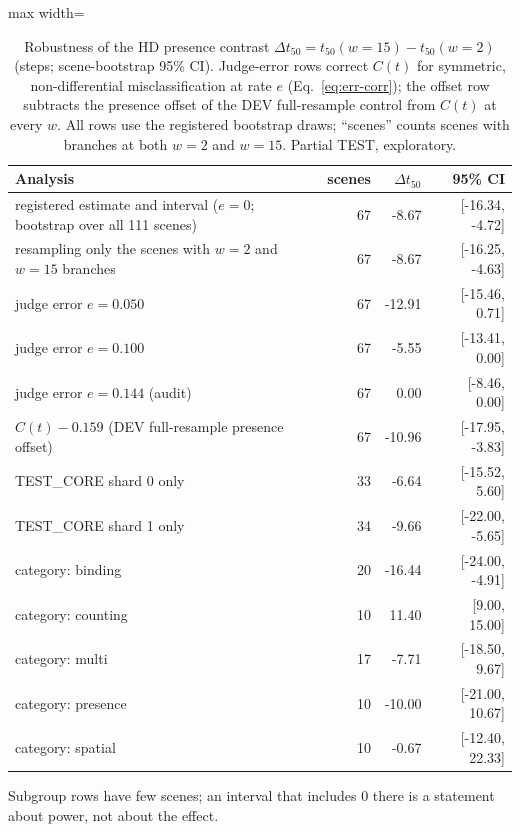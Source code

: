 \begin{table}[t]\centering\small
\caption{Robustness of the HD presence contrast $\Delta t_{50} = t_{50}(w{=}15) - t_{50}(w{=}2)$ (steps; scene-bootstrap 95\% CI). Judge-error rows correct $C(t)$ for symmetric, non-differential misclassification at rate $e$ (Eq.~\ref{eq:err-corr}); the offset row subtracts the presence offset of the DEV full-resample control from $C(t)$ at every $w$. All rows use the registered bootstrap draws; ``scenes'' counts scenes with branches at both $w = 2$ and $w = 15$. Partial TEST, exploratory.}\label{tab:partial-robust-hd}
\begin{adjustbox}{max width=\linewidth}\begin{tabular}{lrrr}
\toprule
Analysis & scenes & $\Delta t_{50}$ & 95\% CI \\
\midrule
registered estimate and interval ($e = 0$; bootstrap over all 111 scenes) & 67 & -8.67 & [-16.34, -4.72] \\
resampling only the scenes with $w = 2$ and $w = 15$ branches & 67 & -8.67 & [-16.25, -4.63] \\
judge error $e = 0.050$ & 67 & -12.91 & [-15.46, 0.71] \\
judge error $e = 0.100$ & 67 & -5.55 & [-13.41, 0.00] \\
judge error $e = 0.144$ (audit) & 67 & 0.00 & [-8.46, 0.00] \\
$C(t) - 0.159$ (DEV full-resample presence offset) & 67 & -10.96 & [-17.95, -3.83] \\
TEST\_CORE shard 0 only & 33 & -6.64 & [-15.52, 5.60] \\
TEST\_CORE shard 1 only & 34 & -9.66 & [-22.00, -5.65] \\
category: binding & 20 & -16.44 & [-24.00, -4.91] \\
category: counting & 10 & 11.40 & [9.00, 15.00] \\
category: multi & 17 & -7.71 & [-18.50, 9.67] \\
category: presence & 10 & -10.00 & [-21.00, 10.67] \\
category: spatial & 10 & -0.67 & [-12.40, 22.33] \\
\bottomrule
\end{tabular}\end{adjustbox}
\par\smallskip\footnotesize Subgroup rows have few scenes; an interval that includes 0 there is a statement about power, not about the effect.
\end{table}
